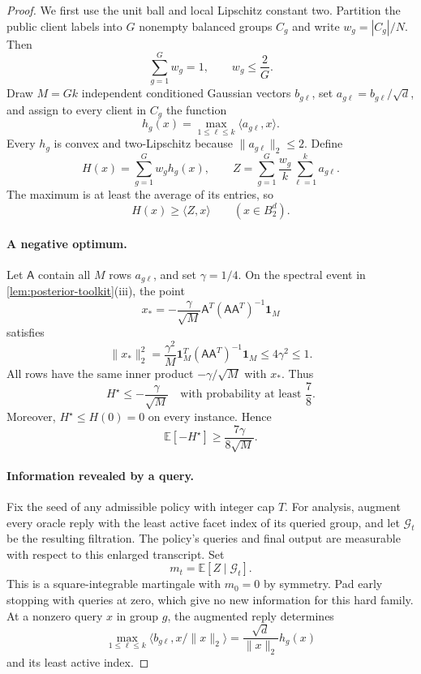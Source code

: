 \documentclass[11pt]{article}
\numberwithin{equation}{section}
\theoremstyle{remark}
\theoremstyle{definition}
\newcommand{\E}{\mathbb{E}}
\newcommand{\cG}{\mathcal{G}}
\newcommand{\Ball}{B_2}
\newcommand{\ip}[2]{\langle #1,#2\rangle}
\newcommand{\norm}[1]{\lVert #1\rVert_2}
\begin{document}
\begin{proof}
We first use the unit ball and local Lipschitz constant two.
Partition the public client labels into $G$ nonempty balanced groups
$C_g$ and write $w_g=|C_g|/N$. Then
\[
 \sum_{g=1}^G w_g=1,\qquad w_g\le\frac2G.
\]
Draw $M=Gk$ independent conditioned Gaussian vectors $b_{g\ell}$,
set $a_{g\ell}=b_{g\ell}/\sqrt d$, and assign to every client in
$C_g$ the function
\[
 h_g(x)=\max_{1\le\ell\le k}\ip{a_{g\ell}}x.
\]
Every $h_g$ is convex and two-Lipschitz because
$\norm{a_{g\ell}}\le2$. Define
\[
 H(x)=\sum_{g=1}^G w_g h_g(x),\qquad
 Z=\sum_{g=1}^G\frac{w_g}{k}\sum_{\ell=1}^k a_{g\ell}.
\]
The maximum is at least the average of its entries, so
\begin{equation}
 H(x)\ge\ip Zx\qquad(x\in\Ball^d).
 \label{eq:support-linear-minorant}
\end{equation}

\paragraph{A negative optimum.}
Let $\mathsf A$ contain all $M$ rows $a_{g\ell}$, and set
$\gamma=1/4$. On the spectral event in
\cref{lem:posterior-toolkit}(iii), the point
\[
 x_*=-\frac\gamma{\sqrt M}
       \mathsf A^T(\mathsf A\mathsf A^T)^{-1}\mathbf1_M
\]
satisfies
\[
 \norm{x_*}^2
 =\frac{\gamma^2}{M}
   \mathbf1_M^T(\mathsf A\mathsf A^T)^{-1}\mathbf1_M
 \le4\gamma^2\le1.
\]
All rows have the same inner product $-\gamma/\sqrt M$ with $x_*$.
Thus
\begin{equation}
 H^\star\le-\frac\gamma{\sqrt M}
 \quad\text{with probability at least }\frac78.
 \label{eq:hard-optimum}
\end{equation}
Moreover, $H^\star\le H(0)=0$ on every instance. Hence
\begin{equation}
 \E[-H^\star]\ge\frac{7\gamma}{8\sqrt M}.
 \label{eq:support-expected-optimum}
\end{equation}

\paragraph{Information revealed by a query.}
Fix the seed of any admissible policy with integer cap $T$.
For analysis, augment every oracle reply with the least active facet
index of its queried group, and let $\cG_t$ be the resulting filtration.
The policy's queries and final output are measurable with respect to
this enlarged transcript. Set
\[
 m_t=\E[Z\mid\cG_t].
\]
This is a square-integrable martingale with $m_0=0$ by symmetry.
Pad early stopping with queries at zero, which give no new information
for this hard family. At a nonzero query $x$ in group $g$, the
augmented reply determines
\[
 \max_{1\le\ell\le k}
 \ip{b_{g\ell}}{x/\norm x}
 =\frac{\sqrt d}{\norm x}h_g(x)
\]
and its least active index.


\end{proof}
\end{document}
